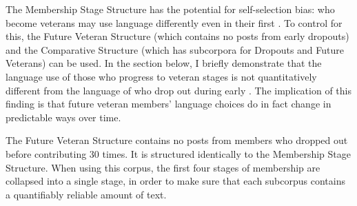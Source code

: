 The Membership Stage Structure has the potential for self-selection bias:  who become veterans may use language differently even in their first . To control for this, the Future Veteran Structure (which contains no \glspl{post} from early dropouts) and the Comparative Structure (which has subcorpora for Dropouts and Future Veterans) can be used. In the section below, I briefly demonstrate that the language use of those  who progress to veteran stages is not quantitatively different from the language of  who drop out during early . The implication of this finding is that future veteran members' language choices do in fact change in predictable ways over time.



The Future Veteran Structure contains no \glspl{post} from \glspl{member} who dropped out before contributing 30 times. It is structured identically to the Membership Stage Structure. When using this \gls{corpus}, the first four stages of membership are collapsed into a single stage, in order to make sure that each subcorpus contains a quantifiably reliable amount of text.

